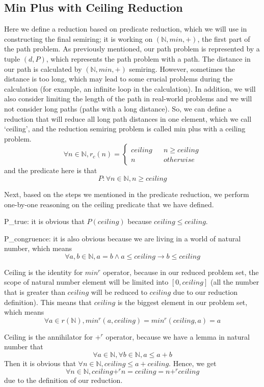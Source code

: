 \documentclass[a4paper,12pt,twoside,openright]{report}
\newcommand{\e}[2]{
\begin{equation}
  \label{#1} 
  #2
\end{equation}
}
\begin{document}
\subsection{Min Plus with Ceiling Reduction}
Here we define a reduction based on predicate reduction, which we will use in constructing the final semiring; it is working on $(\mathbb{N},min,+)$, the first part of the path problem. 
As previously mentioned, our path problem is represented by a tuple $(d,P)$, which represents the path problem with a path. 
The distance in our path is calculated by $(\mathbb{N},min,+)$ semiring. 
However, sometimes the distance is too long, which may lead to some crucial problems during the calculation (for example, an infinite loop in the calculation). In addition, we will also consider limiting the length of the path in real-world problems and we will not consider long paths (paths with a long distance). 
So, we can define a reduction that will reduce all long path distances in one element, which we call ‘ceiling’, and the reduction semiring problem is called min plus with a ceiling problem. \e{pr:def:min_plus_ceiling}{\forall n \in \mathbb{N}, r_c(n) = \left\{
\begin{aligned}
ceiling &  & n \geq ceiling \\
n &  & otherwise 
\end{aligned}
\right.} and the predicate here is that \[P : \forall n \in \mathbb{N}, n \geq ceiling\]

Next, based on the steps we mentioned in the predicate reduction, we perform one-by-one reasoning on the ceiling predicate that we have defined.

P\_true: it is obvious that $P(ceiling)$ because $ceiling \leq ceiling$.

P\_congruence: it is also obvious because we are living in a world of natural number, which means \[\forall a,b \in \mathbb{N}, a = b \wedge a \leq ceiling \rightarrow b \leq ceiling\]

Ceiling is the identity for $min^r$ operator, because in our reduced problem set, the scope of natural number element will be limited into $[0,ceiling]$ (all the number that is greater than $ceiling$ will be reduced to $ceiling$ due to our reduction definition). This means that $ceiling$ is the biggest element in our problem set, which means \[\forall a \in r(\mathbb{N}), min^r (a,ceiling) = min^r(ceiling,a) = a\]

Ceiling is the annihilator for $+^r$ operator, because we have a lemma in natural number that \[\forall a \in \mathbb{N}, \forall b \in \mathbb{N}, a \leq a + b\] Then it is obvious that $\forall n \in \mathbb{N}, ceiling \leq a + ceiling$. Hence, we get \[\forall n \in \mathbb{N}, ceiling +^r n = ceiling = n +^r ceiling\] due to the definition of our reduction.
\end{document}

